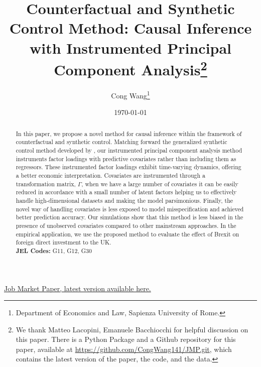 \documentclass[12pt]{article}
\begin{document}
\begin{titlepage}
    \title{Counterfactual and Synthetic Control Method: Causal Inference with Instrumented Principal Component Analysis\thanks{We thank Matteo Lacopini, Emanuele Bacchiocchi for helpful discussion on this paper. There is a Python Package and a Github repository for this paper, available at \href{https://github.com/CongWang141/JMP.git}{https://github.com/CongWang141/JMP.git}, which contains the latest version of the paper, the code, and the data.}} 

    \author{Cong Wang\thanks{Department of Economics and Law, Sapienza University of Rome.}}
    \date{\today}
    \maketitle
    \begin{center}
        \href{https://github.com/CongWang141/JMP/blob/main/latex/main.pdf}{Job Market Paper, latest version available here.}
    \end{center}

    \begin{abstract}
        \noindent In this paper, we propose a novel method for causal inference within the framework of counterfactual and synthetic control. Matching forward the generalized synthetic control method developed by \cite{xu2017generalized}, our instrumented principal component analysis method instruments factor loadings with predictive covariates rather than including them as regressors. These instrumented factor loadings exhibit time-varying dynamics, offering a better economic interpretation. Covariates are instrumented through a transformation matrix, $\Gamma$, when we have a large number of covariates it can be easily reduced in accordance with a small number of latent factors helping us to effectively handle high-dimensional datasets and making the model parsimonious. Finally, the novel way of handling covariates is less exposed to model misspecification and achieved better prediction accuracy. Our simulations show that this method is less biased in the presence of unobserved covariates compared to other mainstream approaches. In the empirical application, we use the proposed method to evaluate the effect of Brexit on foreign direct investment to the UK.\\

        \noindent\textbf{JEL Codes:} G11, G12, G30\\
        \bigskip
    \end{abstract}

    \setcounter{page}{0}
    \thispagestyle{empty}
\end{titlepage}
\end{document}
